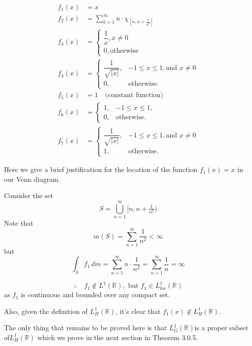 \documentclass{article}
\numberwithin{equation}{section}
{\theoremstyle{break}\newtheorem{theorem}{Theorem}[subsection]}
{\theoremstyle{break}\theorembodyfont{\rmfamily}\newtheorem{example}[theorem]{Example}}
{\theoremstyle{break}\theorembodyfont{\rmfamily}\newtheorem{definition}[theorem]{Definition}}
{\theoremstyle{break}\theorembodyfont{\rmfamily}\newtheorem{notation}[theorem]{Notation}}
{\theoremstyle{break}\theorembodyfont{\rmfamily}\newtheorem{remark}[theorem]{Remark}}
\begin{document}
{{\begin{align*}
    f_1(x) &= x \\
    f_2(x) &= \sum_{k=1}^{\infty} n \cdot \chi_{[n, n + \frac{1}{n^2}]} \\
    f_3(x) &= 
    \begin{cases}
     \dfrac{1}{x}, x\ne0\\
     0,  \text{otherwise}
    \end{cases}\\
    f_4(x) &=
    \begin{cases}
    \dfrac{1}{\sqrt{|x|}}, & -1 \le x \le 1, \text{and } x\ne0 \\[6pt]
    0, & \text{otherwise.}
    \end{cases} \\
    f_5(x) &= 1 \quad \text{(constant function)} \\
    f_6(x) &=
    \begin{cases}
    1, & -1 \le x \le 1, \\[6pt]
    0, & \text{otherwise.}
    \end{cases} \\
    f_7(x) &=
    \begin{cases}
    \dfrac{1}{\sqrt{|x|}}, & -1 \le x \le 1, \text{and } x\ne0 \\[6pt]
    1, & \text{otherwise.}
    \end{cases}
\end{align*}

\begin{remark}
Here we give a brief justification for the location of the function $f_1(x)=x$ in our Venn diagram.

Consider the set 
\[
S = \bigcup_{n=1}^\infty [n, n + \tfrac{1}{n^2})
\]
Note that 
\[
m(S) = \sum_{n=1}^\infty \frac{1}{n^2} < \infty
\]
but 
\[
\int_S f_1 \, dm = \sum_{n=1}^\infty n \cdot \frac{1}{n^2} = \sum_{n=1}^\infty \frac{1}{n} = \infty
\]

\[
\therefore \quad f_1 \notin L^1(\mathbb{R}), \text{ but } f_1 \in L^1_{\text{loc}}(\mathbb{R}) 
\]
as \( f_1 \) is continuous and bounded over any compact set.

Also, given the definition of \( L^1_H(\mathbb{R}) \), it’s clear that \( f_1(x) \notin L^1_H(\mathbb{R}) \).
\end{remark}

The only thing that remains to be proved here is that $L^1_G(\mathbb{R}) $is a proper subset of$L^1_H(\mathbb{R})$ which we prove in the next section in Theorem 3.0.5.



}}
\end{document}
